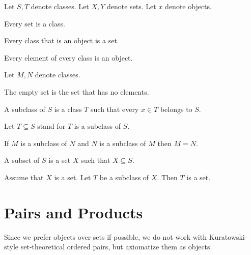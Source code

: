 \documentclass[11pt]{article}
\begin{document}
\begin{forthel}
Let $S,T$ denote classes. Let $X,Y$ denote sets.
Let $x$ denote objects.

\begin{lemma} Every set is a class. \end{lemma}

\begin{lemma} Every class that is an object is a set. \end{lemma}

\begin{axiom} Every element of every class is an object.
\end{axiom}

Let $M,N$ denote classes.

\begin{definition} The empty set is the set that has
no elements.
\end{definition}

\begin{definition}
A subclass of $S$ is a class $T$ such that every $x \in T$
belongs to $S$.
\end{definition}

Let $T \subseteq S$ stand for $T$ is a subclass of $S$.

\begin{lemma}  If $M$ is a subclass of $N$ and
$N$ is a subclass of $M$ then $M = N$.
\end{lemma}

\begin{definition}
A subset of $S$ is a set $X$ such that $X \subseteq S$.
\end{definition}

\begin{axiom}  Assume that $X$ is a set.
Let $T$ be a subclass of $X$. Then $T$ is a set.
\end{axiom}

\end{forthel}
\section{Pairs and Products}
Since we prefer objects over sets if possible, we do not work
with Kuratowski-style set-theoretical ordered pairs, but
axiomatize them as objects.
\end{document}
